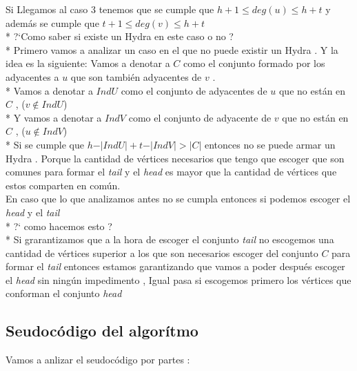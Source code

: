 \documentclass[12pt]{article}
\begin{document}
    \noindent Si Llegamos al caso 3 tenemos que se cumple que  $h+1 \leq deg(u) \leq h + t  $ y adem\'as se cumple que $t+1 \leq deg(v) \leq h + t  $
    \\*
    ?`Como saber si existe un Hydra en este caso o no ? 
    \\*
    Primero vamos a analizar un caso en el que no puede existir un Hydra . Y la idea es la siguiente: 
    Vamos a denotar a $C$ como el conjunto formado por los  adyacentes a $u$ que son tambi\'en adyacentes de $v$ .
    \\* 
    Vamos a denotar a $IndU$ como el conjunto de adyacentes de $u$ que no est\'an en $C$ , ($v \notin IndU$) 
    \\*
    Y vamos a denotar a $IndV$ como el conjunto de adyacente de $v$ que no est\'an en $C$ , ($u \notin IndV$)
    \\*
    Si se cumple que $ h -\vert IndU \vert  +  t - \vert IndV \vert > \vert C \vert $ entonces no se puede armar un Hydra . Porque la cantidad de v\'ertices necesarios 
    que tengo que escoger que son comunes para formar el \textit{tail } y el \textit{head} es mayor que la cantidad de v\'ertices que estos comparten en com\'un. 
    \\[5pt] 
    En caso que lo que analizamos antes no se cumpla entonces si podemos escoger el \textit{head} y el \textit{tail} 
    \\*
    ?` como hacemos esto ? 
    \\*
    Si grarantizamos que a la hora de escoger el conjunto \textit{tail} no escogemos una cantidad de  v\'ertices superior a los que son necesarios escoger del conjunto $C$ para formar el \textit{tail} entonces 
    estamos garantizando que vamos a poder despu\'es escoger el \textit{head} sin ning\'un impedimento , Igual pasa si escogemos primero los v\'ertices que conforman el conjunto \textit{head} 

    \subsection{Seudoc\'odigo del algor\'itmo} 

    \noindent Vamos a anlizar el seudoc\'odigo por partes : 
\end{document}
